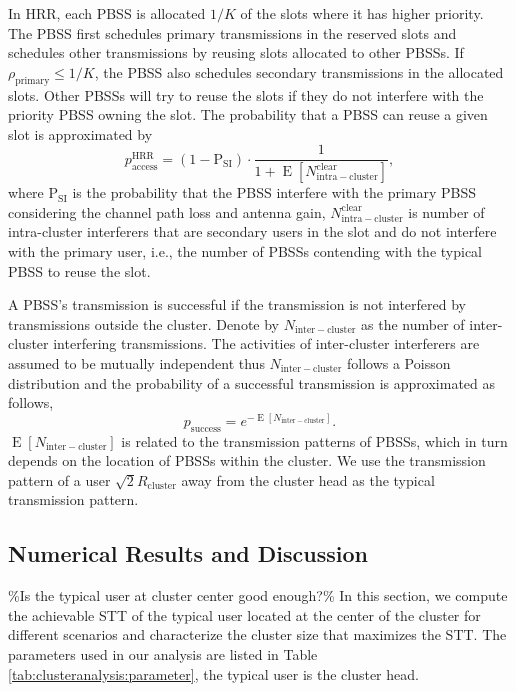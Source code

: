 \documentclass[10pt, conference, letterpaper]{IEEEtran}
\DeclareMathOperator*{\E}{\mathrm{E}}
\begin{document}
In HRR, each PBSS is allocated $1/K$ of the slots where it has higher priority. 
The PBSS first schedules primary transmissions in the reserved slots and schedules other transmissions by reusing slots allocated to other PBSSs. 
If $\rho_{\mathrm{primary}}\leq 1/K$, the PBSS also schedules secondary transmissions in the allocated slots. 
Other PBSSs will try to reuse the slots if they do not interfere with the priority PBSS owning the slot.
The probability that a PBSS can reuse a given slot is approximated by
\begin{equation*}
p_{\mathrm{access}}^{\mathrm{HRR}}=(1-\mathrm{P}_{\mathrm{SI}})\cdot \frac{1}{1+\E[N_{\mathrm{intra-cluster}}^{\mathrm{clear}}]},
\end{equation*}
where $\mathrm{P}_{\mathrm{SI}}$ is the probability that the PBSS interfere with the primary PBSS considering the channel path loss and antenna gain,  
$N_{\mathrm{intra-cluster}}^{\mathrm{clear}}$ is number of intra-cluster interferers that are secondary users in the slot and do not interfere with the primary user, i.e., the number of PBSSs contending with the typical PBSS to reuse the slot.



A PBSS's transmission is successful if the transmission is not interfered by transmissions outside the cluster. 
Denote by $N_{\mathrm{inter-cluster}}$ as the number of inter-cluster interfering transmissions. 
The activities of inter-cluster interferers are assumed to be mutually independent thus $N_{\mathrm{inter-cluster}}$ follows a Poisson distribution and the probability of a successful transmission is approximated as follows, 
\begin{equation*}
p_{\mathrm{success}} = e^{-\E[N_{\mathrm{inter-cluster}}]}.
\end{equation*} 
$\E[N_{\mathrm{inter-cluster}}]$ is related to the transmission patterns of PBSSs, which in turn depends on the location of PBSSs within the cluster. 
We use the transmission pattern of a user $\sqrt{2}R_{\mathrm{cluster}}$ away from the cluster head as the typical transmission pattern.


\subsection{Numerical Results and Discussion}
\%Is the typical user at cluster center good enough?\%
In this section, we compute the achievable STT of the typical user located at the center of the cluster for different scenarios and characterize the cluster size that maximizes the STT. 
The parameters used in our analysis are listed in Table \ref{tab:clusteranalysis:parameter}, the typical user is the cluster head. 
\end{document}
